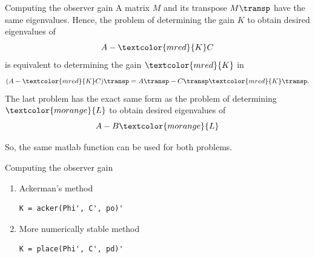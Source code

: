 \documentclass[presentation,aspectratio=169]{beamer}
\begin{document}
\begin{frame}[label={sec:org9c64285}]{Computing the observer gain}
A matrix \(M\) and its transpose \(M\transp\) have the same eigenvalues. Hence, the problem of determining the gain \(K\) to obtain desired eigenvalues of 
\[A- \textcolor{mred}{K}C\] is equivalent to determining the gain \(\textcolor{mred}{K}\) in 
\[(A-\textcolor{mred}{K}C)\transp = A\transp - C\transp \textcolor{mred}{K}\transp.\]
The last problem has the exact same form as the problem of determining \(\textcolor{morange}{L}\) to obtain desired eigenvalues of 
\[A - B \textcolor{morange}{L}\]

So, the same matlab function can be used for both problems.
\end{frame}

\begin{frame}[label={sec:org4bcad0e},fragile]{Computing the observer gain}
 \begin{enumerate}
\item \alert{Ackerman's method} 
\begin{verbatim}
K = acker(Phi', C', po)'
\end{verbatim}
\item \alert{More numerically stable method} 
\begin{verbatim}
K = place(Phi', C', pd)'
\end{verbatim}
\end{enumerate}
\end{frame}
\end{document}

